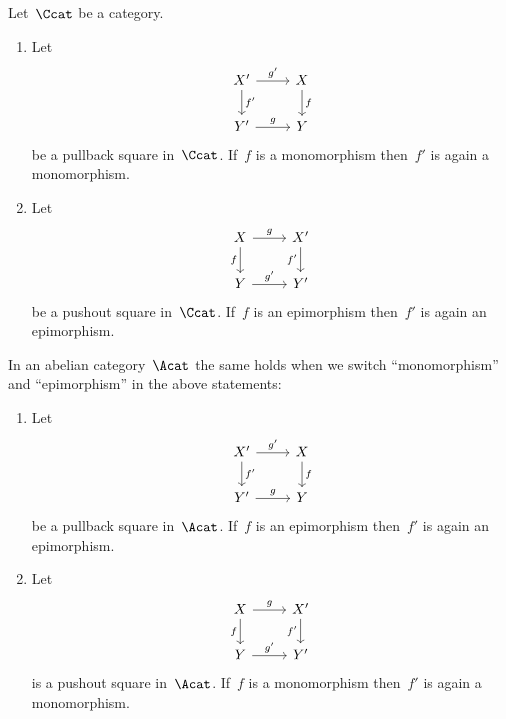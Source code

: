 \begin{proposition*}
  \label{mono epi under pull push}
  Let~$\Ccat$ be a category.
  \begin{enumerate}
    \item
      \label{pullback of mono}
      Let
      \[
        \begin{tikzcd}
            X'
            \arrow{r}[above]{g'}
            \arrow{d}[right]{f'}
          & X
            \arrow{d}[right]{f}
          \\
            Y'
            \arrow{r}[above]{g}
          & Y
        \end{tikzcd}
      \]
      be a pullback square in~$\Ccat$.
      If~$f$ is a monomorphism then~$f'$ is again a monomorphism.
    \item
      Let
      \[
        \begin{tikzcd}
            X
            \arrow{r}[above]{g}
            \arrow{d}[left]{f}
          & X'
            \arrow{d}[left]{f'}
          \\
            Y
            \arrow{r}[above]{g'}
          & Y'
        \end{tikzcd}
      \]
      be a pushout square in~$\Ccat$.
      If~$f$ is an epimorphism then~$f'$ is again an epimorphism.
  \end{enumerate}
  In an abelian category~$\Acat$ the same holds when we switch \enquote{monomorphism} and \enquote{epimorphism} in the above statements:
  \begin{enumerate}[resume]
    \item
      \label{pullback of epi}
      Let
      \[
        \begin{tikzcd}
            X'
            \arrow{r}[above]{g'}
            \arrow{d}[right]{f'}
          & X
            \arrow{d}[right]{f}
          \\
            Y'
            \arrow{r}[above]{g}
          & Y
        \end{tikzcd}
      \]
      be a pullback square in~$\Acat$.
      If~$f$ is an epimorphism then~$f'$ is again an epimorphism.
    \item
      \label{pushout of mono}
      Let
      \[
        \begin{tikzcd}
            X
            \arrow{r}[above]{g}
            \arrow{d}[left]{f}
          & X'
            \arrow{d}[left]{f'}
          \\
            Y
            \arrow{r}[above]{g'}
          & Y'
        \end{tikzcd}
      \]
      is a pushout square in~$\Acat$.
      If~$f$ is a monomorphism then~$f'$ is again a monomorphism.
  \end{enumerate}
\end{proposition*}


